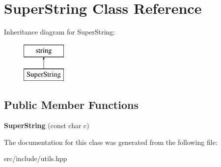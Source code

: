 \hypertarget{classSuperString}{}\section{Super\+String Class Reference}
\label{classSuperString}
Inheritance diagram for Super\+String\+:\begin{figure}[H]
\begin{center}
\leavevmode
\includegraphics[height=2.000000cm]{classSuperString}
\end{center}
\end{figure}
\subsection*{Public Member Functions}
\begin{DoxyCompactItemize}
\item 
\mbox{\label{classSuperString_a60b37c6e46cb005c9af12435b51160b9}} 
{\bfseries Super\+String} (const char c)
\end{DoxyCompactItemize}


The documentation for this class was generated from the following file\+:\begin{DoxyCompactItemize}
\item 
src/include/utils.\+hpp\end{DoxyCompactItemize}
